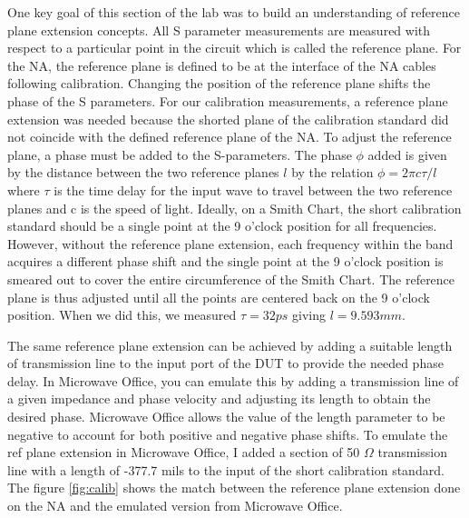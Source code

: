 \documentclass[twocolumn, aps, apl]{revtex4-1}
\begin{document}
One key goal of this section of the lab was to build an understanding of reference plane extension concepts. All S parameter measurements are measured with respect to a particular point in the circuit which is called the reference plane. For the NA, the reference plane is defined to be at the interface of the NA cables following calibration. Changing the position of the reference plane shifts the phase of the S parameters. For our calibration measurements, a reference plane extension was needed because the shorted plane of the calibration standard did not coincide with the defined reference plane of the NA. To adjust the reference plane, a phase must be added to the S-parameters. The phase $\phi$ added is given by the distance between the two reference planes $l$ by the relation $\phi = 2 \pi c \tau/l$ where $\tau$ is the time delay for the input wave to travel between the two reference planes and c is the speed of light.  Ideally, on a Smith Chart, the short calibration standard should be a single point at the 9 o'clock position for all frequencies. However, without the reference plane extension, each frequency within the band acquires a different phase shift and the single point at the 9 o'clock position is smeared out to cover the entire circumference of the Smith Chart. The reference plane is thus adjusted until all the points are centered back on the 9 o'clock position. When we did this, we measured $\tau = 32 ps$ giving $l = 9.593 mm$.

The same reference plane extension can be achieved by adding a suitable length of transmission line to the input port of the DUT to provide the needed phase delay. In Microwave Office, you can emulate this by adding a transmission line of a given impedance and phase velocity and adjusting its length to obtain the desired phase. Microwave Office allows the value of the length parameter to be negative to account for both positive and negative phase shifts. To emulate the ref plane extension in Microwave Office, I added a section of 50 $\Omega$ transmission line with a length of -377.7 mils to the input of the short calibration standard. The figure \ref{fig:calib} shows the match between the reference plane extension done on the NA and the emulated version from Microwave Office.
\end{document}
